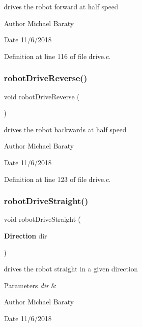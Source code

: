 drives the robot forward at half speed 

\begin{DoxyAuthor}{Author}
Michael Baraty 
\end{DoxyAuthor}
\begin{DoxyDate}{Date}
11/6/2018 
\end{DoxyDate}


Definition at line 116 of file drive.\+c.

\mbox{\label{drive_8c_a151c59da152a110b01311c4f893afd3b}} 
\subsubsection{robot\+Drive\+Reverse()}
{\footnotesize\ttfamily void robot\+Drive\+Reverse (\begin{DoxyParamCaption}{ }\end{DoxyParamCaption})}



drives the robot backwards at half speed 

\begin{DoxyAuthor}{Author}
Michael Baraty 
\end{DoxyAuthor}
\begin{DoxyDate}{Date}
11/6/2018 
\end{DoxyDate}


Definition at line 123 of file drive.\+c.

\mbox{\label{drive_8c_a014c2a00d938c4e3c8aa626ac60e2765}} 
\subsubsection{robot\+Drive\+Straight()}
{\footnotesize\ttfamily void robot\+Drive\+Straight (\begin{DoxyParamCaption}\item[{\textbf{ Direction}}]{dir }\end{DoxyParamCaption})}



drives the robot straight in a given direction 


\begin{DoxyParams}{Parameters}
{\em dir} & \\
\hline
\end{DoxyParams}
\begin{DoxyAuthor}{Author}
Michael Baraty 
\end{DoxyAuthor}
\begin{DoxyDate}{Date}
11/6/2018 
\end{DoxyDate}


